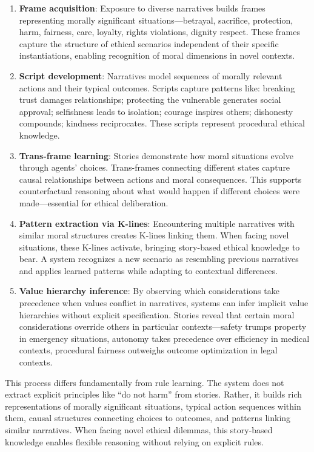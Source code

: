 \documentclass[12pt]{article}
\begin{document}
\begin{enumerate}
\item \textbf{Frame acquisition}: Exposure to diverse narratives builds frames representing morally significant situations---betrayal, sacrifice, protection, harm, fairness, care, loyalty, rights violations, dignity respect. These frames capture the structure of ethical scenarios independent of their specific instantiations, enabling recognition of moral dimensions in novel contexts.

\item \textbf{Script development}: Narratives model sequences of morally relevant actions and their typical outcomes. Scripts capture patterns like: breaking trust damages relationships; protecting the vulnerable generates social approval; selfishness leads to isolation; courage inspires others; dishonesty compounds; kindness reciprocates. These scripts represent procedural ethical knowledge.

\item \textbf{Trans-frame learning}: Stories demonstrate how moral situations evolve through agents' choices. Trans-frames connecting different states capture causal relationships between actions and moral consequences. This supports counterfactual reasoning about what would happen if different choices were made---essential for ethical deliberation.

\item \textbf{Pattern extraction via K-lines}: Encountering multiple narratives with similar moral structures creates K-lines linking them. When facing novel situations, these K-lines activate, bringing story-based ethical knowledge to bear. A system recognizes a new scenario as resembling previous narratives and applies learned patterns while adapting to contextual differences.

\item \textbf{Value hierarchy inference}: By observing which considerations take precedence when values conflict in narratives, systems can infer implicit value hierarchies without explicit specification. Stories reveal that certain moral considerations override others in particular contexts---safety trumps property in emergency situations, autonomy takes precedence over efficiency in medical contexts, procedural fairness outweighs outcome optimization in legal contexts.
\end{enumerate}

This process differs fundamentally from rule learning. The system does not extract explicit principles like ``do not harm'' from stories. Rather, it builds rich representations of morally significant situations, typical action sequences within them, causal structures connecting choices to outcomes, and patterns linking similar narratives. When facing novel ethical dilemmas, this story-based knowledge enables flexible reasoning without relying on explicit rules.
\end{document}
